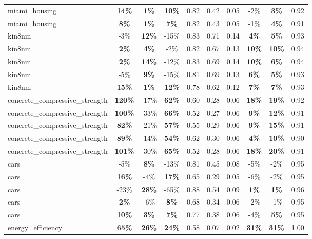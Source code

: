 \begin{table}[!htbp]
\begin{small}
\begin{sc}
{\begin{tabular}{lccccccccc}
miami\_housing & \textbf{14\%} & \textbf{1\%} & \textbf{10\%} & 0.82 & 0.42 & 0.05 & -2\% & \textbf{3\%} & 0.92 \\
miami\_housing & \textbf{8\%} & \textbf{1\%} & \textbf{7\%} & 0.82 & 0.43 & 0.05 & -1\% & \textbf{4\%} & 0.91 \\
kin8nm & -3\% & \textbf{12\%} & -15\% & 0.83 & 0.71 & 0.14 & \textbf{4\%} & \textbf{5\%} & 0.93 \\
kin8nm & \textbf{2\%} & \textbf{4\%} & -2\% & 0.82 & 0.67 & 0.13 & \textbf{10\%} & \textbf{10\%} & 0.94 \\
kin8nm & \textbf{2\%} & \textbf{14\%} & -12\% & 0.83 & 0.69 & 0.14 & \textbf{10\%} & \textbf{6\%} & 0.94 \\
kin8nm & -5\% & \textbf{9\%} & -15\% & 0.81 & 0.69 & 0.13 & \textbf{6\%} & \textbf{5\%} & 0.93 \\
kin8nm & \textbf{15\%} & \textbf{1\%} & \textbf{12\%} & 0.78 & 0.62 & 0.12 & \textbf{7\%} & \textbf{7\%} & 0.93 \\
concrete\_compressive\_strength & \textbf{120\%} & -17\% & \textbf{62\%} & 0.60 & 0.28 & 0.06 & \textbf{18\%} & \textbf{19\%} & 0.92 \\
concrete\_compressive\_strength & \textbf{100\%} & -33\% & \textbf{66\%} & 0.52 & 0.27 & 0.06 & \textbf{9\%} & \textbf{12\%} & 0.91 \\
concrete\_compressive\_strength & \textbf{82\%} & -21\% & \textbf{57\%} & 0.55 & 0.29 & 0.06 & \textbf{9\%} & \textbf{15\%} & 0.91 \\
concrete\_compressive\_strength & \textbf{89\%} & -14\% & \textbf{54\%} & 0.62 & 0.30 & 0.06 & \textbf{4\%} & \textbf{10\%} & 0.90 \\
concrete\_compressive\_strength & \textbf{101\%} & -30\% & \textbf{65\%} & 0.52 & 0.28 & 0.06 & \textbf{18\%} & \textbf{20\%} & 0.91 \\
cars & -5\% & \textbf{8\%} & -13\% & 0.81 & 0.45 & 0.08 & -5\% & -2\% & 0.95 \\
cars & \textbf{16\%} & -4\% & \textbf{17\%} & 0.65 & 0.29 & 0.05 & -6\% & -2\% & 0.95 \\
cars & -23\% & \textbf{28\%} & -65\% & 0.88 & 0.54 & 0.09 & \textbf{1\%} & \textbf{1\%} & 0.96 \\
cars & \textbf{2\%} & -6\% & \textbf{8\%} & 0.68 & 0.34 & 0.06 & -2\% & -1\% & 0.95 \\
cars & \textbf{10\%} & \textbf{3\%} & \textbf{7\%} & 0.77 & 0.38 & 0.06 & -4\% & \textbf{5\%} & 0.95 \\
energy\_efficiency & \textbf{65\%} & \textbf{26\%} & \textbf{24\%} & 0.58 & 0.07 & 0.02 & \textbf{31\%} & \textbf{31\%} & 1.00 \\

\end{tabular}}
\end{sc}
\end{small}
\end{table}
